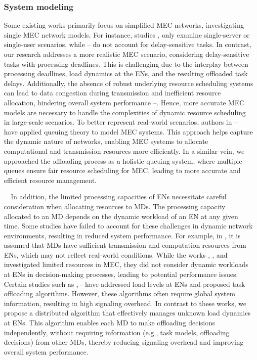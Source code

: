 \documentclass[12pt,draftclsnofoot,onecolumn]{IEEEtran}
\newenvironment{my}[2]%
{\begin{list}{}%
{\setlength{\rightmargin}{#1}\setlength{\leftmargin}{#2}}%


 \item[]{}

} {\end{list}}
\begin{document}
\begin{enumerate}
\begin{my}{1cm}{1cm}
{		\subsubsection{System modeling}
		Some existing works primarily focus on simplified MEC networks, investigating single MEC network models. For instance, studies \cite{zhou2021deep}, \cite{liu2021learn} only examine single-server or single-user scenarios, while \cite{huang2019deep}--\cite{wu2023computation} do not account for delay-sensitive tasks. In contrast, our research addresses a more realistic MEC scenario, considering delay-sensitive tasks with processing deadlines. This is challenging due to the interplay between processing deadlines, load dynamics at the ENs, and the resulting offloaded task delays. Additionally, the absence of robust underlying resource scheduling systems can lead to data congestion during transmission and inefficient resource allocation, hindering overall system performance \cite{wang2020reinforcement}--\cite{chen2021drl}. Hence, more accurate MEC models are necessary to handle the complexities of dynamic resource scheduling in large-scale scenarios.
		To better represent real-world scenarios, authors in \cite{Bolourian-WCL24}--\cite{9253665} have applied queuing theory to model MEC systems. This approach helps capture the dynamic nature of networks, enabling MEC systems to allocate computational and transmission resources more efficiently. In a similar vein, we approached the offloading process as a holistic queuing system, where multiple queues ensure fair resource scheduling for MEC, leading to more accurate and efficient resource management.\vspace{3mm}
		
		\,\,\,\,
		In addition, the limited processing capacities of ENs necessitate careful consideration when allocating resources to MDs. The processing capacity allocated to an MD depends on the dynamic workload of an EN at any given time. Some studies have failed to account for these challenges in dynamic network environments, resulting in reduced system performance. For example, in \cite{chen2021drl}, it is assumed that MDs have sufficient transmission and computation resources from ENs, which may not reflect real-world conditions. While the works \cite{zhao2019deep}, \cite{dai2020edge}, and \cite{wu2024privacy} investigated limited resources in MEC, they did not consider dynamic workloads at ENs in decision-making processes, leading to potential performance issues.
		Certain studies such as \cite{sun2024hierarchical}, \cite{gong2022edge}-\cite{gao2022large} have addressed load levels at ENs and proposed task offloading algorithms. However, these algorithms often require global system information, resulting in high signaling overhead. In contrast to these works, we propose a distributed algorithm that effectively manages unknown load dynamics at ENs. This algorithm enables each MD to make offloading decisions independently, without requiring information (e.g., task models, offloading decisions) from other MDs, thereby reducing signaling overhead and improving overall system performance.\vspace{3mm}
}
\end{my}
\end{enumerate}
\end{document}

